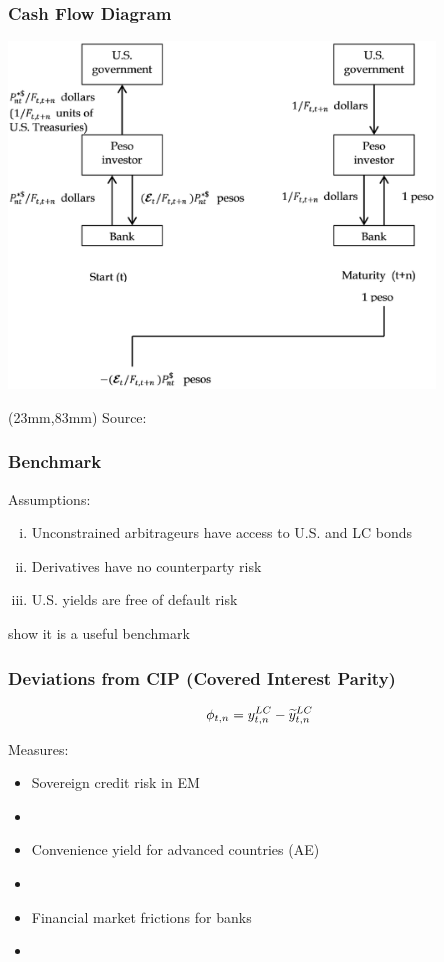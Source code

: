 \documentclass[12pt, aspectratio=169, xcolor=dvipsnames]{beamer}
\begin{document}
\begin{frame}
\frametitle{Cash Flow Diagram}
\begin{center}
	\includegraphics[width=0.85\textwidth,height=0.83\textheight]{../Figures/Slides/Cash_Flow_Diagram_Synthetic_LC.png}
\end{center}
\begin{textblock*}{50mm}(23mm,83mm)
	\tiny Source: \cite{DuSchreger:2016JoF}
\end{textblock*}
\end{frame}


\begin{frame}
\frametitle{Benchmark}

Assumptions:
\begin{enumerate}[(i)]
	\item Unconstrained arbitrageurs have access to U.S. and LC bonds
	\item Derivatives have no counterparty risk
	\item U.S. yields are free of default risk
\end{enumerate}

\cite{DuSchreger:2016JoF} show it is a \alert{useful benchmark}
\end{frame}


\begin{frame}[label=DevCIP]
\frametitle{Deviations from CIP (Covered Interest Parity)}
\[\phi_{t,n} = y_{t,n} ^{LC} - \widetilde{y}_{t,n} ^{LC}\]

	Measures:
	\begin{itemize}
		\item \alert{Sovereign credit risk} in EM
		\item[] \cite{DuSchreger:2016JoF} %
		\item \alert{Convenience yield} for advanced countries (AE)
		\item[] \cite*{DuImSchreger:2018JIE} %
		\item Financial market \alert{frictions} for banks 
		\item[] \cite*{DuTepperVerdelhan:2018} %
	\end{itemize}
\end{frame}
\end{document}
